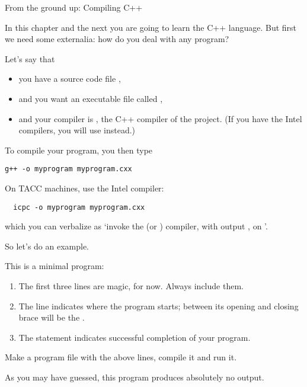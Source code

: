 
 {From the ground up: Compiling C++}

In this chapter and the next you are going to learn the C++
language. But first we need some externalia: how do you deal with any
program?

Let's say that
\begin{itemize}
\item you have a source code file ,
\item and you want an executable file called ,
\item and your compiler is , the C++ compiler of the
   project. (If you have the Intel compilers, you will
  use  instead.)
\end{itemize}
To compile your program, you then type
\begin{verbatim}
g++ -o myprogram myprogram.cxx
\end{verbatim}
\begin{tacc}
  On TACC machines, use the Intel compiler:
\begin{verbatim}
  icpc -o myprogram myprogram.cxx
\end{verbatim}
\end{tacc}

which you can verbalize as `invoke the  (or ) compiler,
with output , on '.

So let's do an example.

This is a minimal program:
%
%
\begin{enumerate}
\item The first three lines are magic, for now. Always include them.
\item The  line indicates where the program starts; between
  its opening and closing brace will be the
  .
\item The  statement indicates successful completion of your program.
\end{enumerate}
\begin{exercise}
  Make a program file with the above lines, compile it and run it.
\end{exercise}
As you may have guessed, this program produces absolutely no output.

